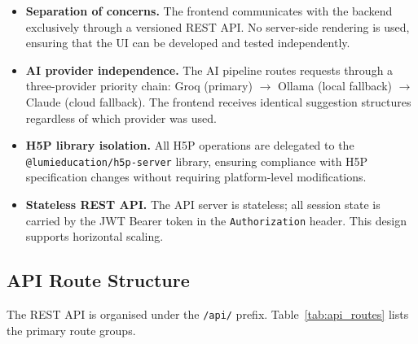 \begin{itemize}
  \item \textbf{Separation of concerns.} The frontend communicates with the
  backend exclusively through a versioned REST API. No server-side rendering
  is used, ensuring that the UI can be developed and tested independently.

  \item \textbf{AI provider independence.} The AI pipeline routes requests
  through a three-provider priority chain: Groq (primary) $\to$ Ollama
  (local fallback) $\to$ Claude (cloud fallback). The frontend receives
  identical suggestion structures regardless of which provider was used.

  \item \textbf{H5P library isolation.} All H5P operations are delegated to
  the \texttt{@lumieducation/h5p-server} library, ensuring compliance with
  H5P specification changes without requiring platform-level modifications.

  \item \textbf{Stateless REST API.} The API server is stateless; all
  session state is carried by the JWT Bearer token in the
  \texttt{Authorization} header. This design supports horizontal scaling.
\end{itemize}

\subsection{API Route Structure}

The REST API is organised under the \texttt{/api/} prefix. Table~\ref{tab:api_routes}
lists the primary route groups.

